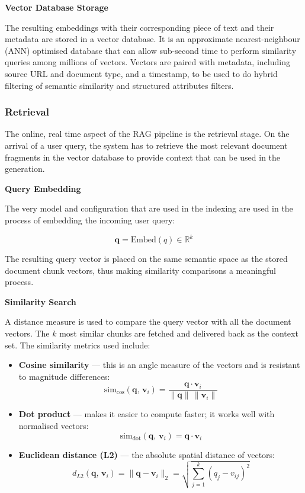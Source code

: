 \textbf{Vector Database Storage}

The resulting embeddings with their corresponding piece of text and their metadata are stored in a vector database. It is an approximate nearest-neighbour (ANN) optimised database that can allow sub-second time to perform similarity queries among millions of vectors. Vectors are paired with metadata, including source URL and document type, and a timestamp, to be used to do hybrid filtering of semantic similarity and structured attributes filters.

\subsubsection{Retrieval}

The online, real time aspect of the RAG pipeline is the retrieval stage. On the arrival of a user query, the system has to retrieve the most relevant document fragments in the vector database to provide context that can be used in the generation.

\textbf{Query Embedding}

The very model and configuration that are used in the indexing are used in the process of embedding the incoming user query:

\begin{equation}
    \mathbf{q} = \text{Embed}(q) \in \mathbb{R}^{k}
\end{equation}

The resulting query vector is placed on the same semantic space as the stored document chunk vectors, thus making similarity comparisons a meaningful process.

\textbf{Similarity Search}

A distance measure is used to compare the query vector with all the document vectors. The $k$ most similar chunks are fetched and delivered back as the context set. The similarity metrics used include:
\begin{itemize}
    \item \textbf{Cosine similarity} — this is an angle measure of the vectors and is resistant to magnitude differences:
    \begin{equation}
        \text{sim}_{\cos}(\mathbf{q},\, \mathbf{v}_i) = \frac{\mathbf{q} \cdot \mathbf{v}_i}{\|\mathbf{q}\|\,\|\mathbf{v}_i\|}
    \end{equation}

    \item \textbf{Dot product} — makes it easier to compute faster; it works well with normalised vectors:
    \begin{equation}
        \text{sim}_{\text{dot}}(\mathbf{q},\, \mathbf{v}_i) = \mathbf{q} \cdot \mathbf{v}_i
    \end{equation}

    \item \textbf{Euclidean distance (L2)} — the absolute spatial distance of vectors:
    \begin{equation}
        d_{L2}(\mathbf{q},\, \mathbf{v}_i) = \|\mathbf{q} - \mathbf{v}_i\|_2 = \sqrt{\sum_{j=1}^{k}(q_j - v_{ij})^2}
    \end{equation}
\end{itemize}

